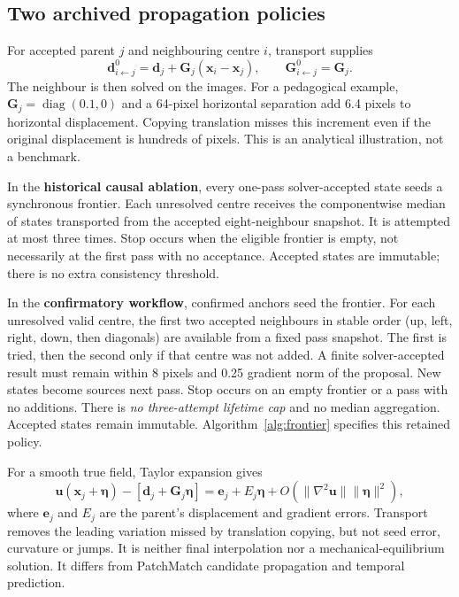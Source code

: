 \subsection{Two archived propagation policies}\label{sec:policies}
For accepted parent $j$ and neighbouring centre $i$, transport supplies
\begin{equation}
\mathbf d^{0}_{i\leftarrow j}=\mathbf d_j+\mathbf G_j(\mathbf x_i-\mathbf x_j),\qquad
\mathbf G^{0}_{i\leftarrow j}=\mathbf G_j.\label{eq:transport}
\end{equation}
The neighbour is then solved on the images. For a pedagogical example, $\mathbf G_j=\operatorname{diag}(0.1,0)$ and a 64-pixel horizontal separation add 6.4 pixels to horizontal displacement. Copying translation misses this increment even if the original displacement is hundreds of pixels. This is an analytical illustration, not a benchmark.

In the \textbf{historical causal ablation}, every one-pass solver-accepted state seeds a synchronous frontier. Each unresolved centre receives the componentwise median of states transported from the accepted eight-neighbour snapshot. It is attempted at most three times. Stop occurs when the eligible frontier is empty, not necessarily at the first pass with no acceptance. Accepted states are immutable; there is no extra consistency threshold.

In the \textbf{confirmatory workflow}, confirmed anchors seed the frontier. For each unresolved valid centre, the first two accepted neighbours in stable order (up, left, right, down, then diagonals) are available from a fixed pass snapshot. The first is tried, then the second only if that centre was not added. A finite solver-accepted result must remain within 8 pixels and 0.25 gradient norm of the proposal. New states become sources next pass. Stop occurs on an empty frontier or a pass with no additions. There is \emph{no three-attempt lifetime cap} and no median aggregation. Accepted states remain immutable. Algorithm~\ref{alg:frontier} specifies this retained policy.

For a smooth true field, Taylor expansion gives
\begin{equation}
\mathbf u(\mathbf x_j+\boldsymbol\eta)-[\mathbf d_j+\mathbf G_j\boldsymbol\eta]
=\mathbf e_j+E_j\boldsymbol\eta+O(\|\nabla^2\mathbf u\|\|\boldsymbol\eta\|^2),\label{eq:taylor}
\end{equation}
where $\mathbf e_j$ and $E_j$ are the parent's displacement and gradient errors. Transport removes the leading variation missed by translation copying, but not seed error, curvature or jumps. It is neither final interpolation nor a mechanical-equilibrium solution. It differs from PatchMatch candidate propagation and temporal prediction.


